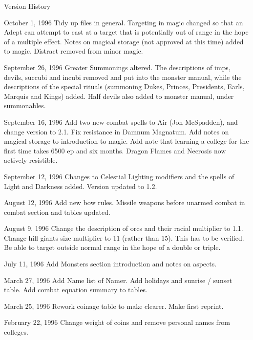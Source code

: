 \begin{Chapter}{Version History}
\begin{Description}
\item[October 1, 1996] Tidy up files in general. Targeting in magic
  changed so that an Adept can attempt to cast at a target that is
  potentially out of range in the hope of a multiple effect. Notes on
  magical storage (not approved at this time) added to magic. Distract
  removed from minor magic.

\item[September 26, 1996] Greater Summonings altered.  The
  descriptions of imps, devils, succubi and incubi removed and put
  into the monster manual, while the descriptions of the special
  rituals (summoning Dukes, Princes, Presidents, Earls, Marquis and
  Kings) added.  Half devils also added to monster manual, under
  summonables.

\item[September 16, 1996] Add two new combat spells to Air (Jon
  McSpadden), and change version to 2.1.  Fix resistance in Damnum
  Magnatum.  Add notes on magical storage to introduction to magic.
  Add note that learning a college for the first time takes 6500 ep
  and six months.  Dragon Flames and Necrosis now actively resistible.

\item[September 12, 1996] Changes to Celestial Lighting modifiers and
  the spells of Light and Darkness added. Version updated to 1.2.

\item[August 12, 1996] Add new bow rules.  Missile weapons before
  unarmed combat in combat section and tables updated.

\item[August 9, 1996] Change the description of orcs and their racial
  multiplier to 1.1. Change hill giants size multiplier to 11 (rather
  than 15).  This has to be verified.  Be able to target outside
  normal range in the hope of a double or triple.

\item[July 11, 1996] Add Monsters section introduction and notes on
  aspects.

\item[March 27, 1996] Add Name list of Namer.  Add holidays and
  sunrise / sunset table.  Add combat equation summary to tables.

\item[March 25, 1996] Rework coinage table to make clearer. Make first
  reprint.

\item[February 22, 1996] Change weight of coins and remove personal
  names from colleges.


\end{Description}
\end{Chapter}
